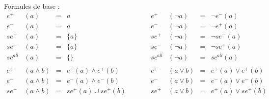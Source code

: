 \documentclass[12pt]{article}
\begin{document}
Formules de base :
$$
  \begin{array}{rlclcrlcl}
    e^+      & (a)               & = & a                                                                  & \qquad & e^+      & (\neg a)              & = & \neg e^- (a)                                                                                                 \\
    e^-      & (a)               & = & a                                                                  & \qquad & e^-      & (\neg a)              & = & \neg e^+ (a)                                                                                                 \\
    se^+     & (a)               & = & \{ a \}                                                            & \qquad & se^+     & (\neg a)              & = & \neg se^- (a)                                                                                                \\
    se^-     & (a)               & = & \{ a \}                                                            & \qquad & se^-     & (\neg a)              & = & \neg se^+ (a)                                                                                                \\
    sc^{all} & (a)               & = & \{ \}                                                              & \qquad & sc^{all} & (\neg a)              & = & sc^{all} (a)                                                                                                 \\
    \\
    e^+      & (a \land b)       & = & e^+ (a) \land e^+ (b)                                              & \qquad & e^+      & (a \lor b)            & = & e^+ (a) \lor e^+ (b)                                                                                         \\
    e^-      & (a \land b)       & = & e^- (a) \land e^- (b)                                              & \qquad & e^-      & (a \lor b)            & = & e^- (a) \lor e^- (b)                                                                                         \\
    se^+     & (a \land b)       & = & se^+ (a) \cup se^+ (b)                                             & \qquad & se^+     & (a \lor b)            & = & e^+ (a) \lor se^+ (b)                                                                                        \\

\end{array}$$
\end{document}
